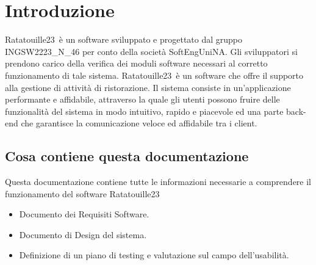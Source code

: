 \section{Introduzione}
Ratatouille23\texttrademark\ è un software sviluppato e progettato dal gruppo INGSW2223\_N\_46 per conto della società SoftEngUniNA\texttrademark. \newline
Gli sviluppatori si prendono carico della verifica dei moduli software necessari al corretto funzionamento di tale sistema.
Ratatouille23\texttrademark\ è un software che offre il supporto alla gestione di attività di
ristorazione.\newline
Il sistema consiste in un’applicazione performante e affidabile, attraverso la quale gli utenti
possono fruire delle funzionalità del sistema in modo intuitivo, rapido e piacevole ed una parte back-end che garantisce la comunicazione veloce ed affidabile tra i client.

\subsection{Cosa contiene questa documentazione}
Questa documentazione contiene tutte le informazioni necessarie a comprendere il funzionamento del software Ratatouille23\texttrademark
\begin{itemize}
    \item Documento dei Requisiti Software.
    \item Documento di Design del sistema.
    \item Definizione di un piano di testing e valutazione sul campo dell’usabilità.
\end{itemize}

